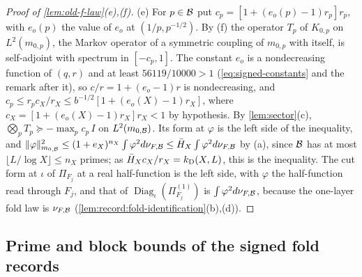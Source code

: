\begin{proof}[Proof of \cref{lem:old-f-law}(e),(f)]
(e) For $p\in\mathcal B$ put $c_p=[1+(e_o(p)-1)r_p]r_p$, with $e_o(p)$ the value of $e_o$
at $(1/p,p^{-1/2})$. By (f) the operator $T_p$ of $K_{0,p}$ on $L^2(m_{0,p})$, the
Markov operator of a symmetric coupling of $m_{0,p}$ with itself, is
self-adjoint with spectrum in $[-c_p,1]$. The constant $e_o$ is a
nondecreasing function of $(q,r)$ and at least $56119/10000>1$
(\eqref{eq:signed-constants} and the remark after it), so $c/r=1+(e_o-1)r$ is
nondecreasing, and $c_p\le r_pc_X/r_X\le b^{-1/2}[1+(e_o(X)-1)r_X]$, where
$c_X=[1+(e_o(X)-1)r_X]r_X<1$ by hypothesis. By \cref{lem:sector}(c),
$\bigotimes_pT_p\succeq-\max_pc_p\,I$ on $L^2(m_{0,\mathcal B})$. Its form at $\varphi$ is the
left side of the inequality, and
$\|\varphi\|^2_{m_{0,\mathcal B}}\le(1+e_X)^{n_X}\int\varphi^2d\nu_{F,\mathcal B}\le\bar H_X\int\varphi^2d\nu_{F,\mathcal B}$
by (a), since $\mathcal B$ has at most $\lfloor L/\log X\rfloor\le n_X$ primes; as
$\bar H_Xc_X/r_X=k_{\rm D}(X,L)$, this is the inequality. The cut form at
$\iota$ of $\Pi_{F_j}$ at a real half-function is the left side, with $\varphi$ the
half-function read through $F_j$, and that of
$\operatorname{Diag}_\iota(\Pi^{(1)}_{F_j})$ is $\int\varphi^2d\nu_{F,\mathcal B}$, because the
one-layer fold law is $\nu_{F,\mathcal B}$
(\cref{lem:record:fold-identification}(b),(d)).
\end{proof}

\subsection{Prime and block bounds of the signed fold records}
\label{subsec:pure-bounds}

